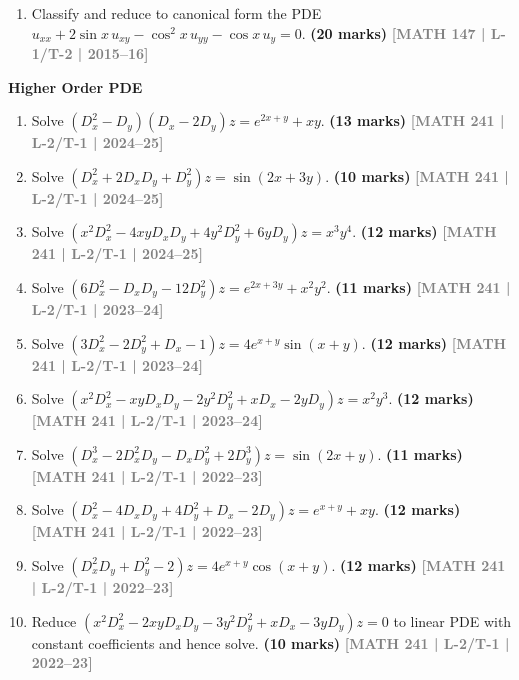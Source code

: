 \documentclass[12pt,a4paper]{article}
\newcommand{\yr}[1]{\hfill\textcolor{gray}{\small\textbf{[#1]}}}
\newcommand{\mk}[1]{\textcolor{orange!70!black}{\small\textbf{(#1 marks)}}}
\newcommand{\subtopic}[2]{%
  \vspace{10pt}
  \noindent\begin{tcolorbox}[colback=#1!8,colframe=#1,boxrule=0.6pt,arc=4pt,
    left=6pt,right=6pt,top=4pt,bottom=4pt]
    \small\bfseries\textcolor{#1}{#2}
  \end{tcolorbox}
  \vspace{2pt}
}
\begin{document}
\begin{enumerate}\item Classify and reduce to canonical form the PDE $u_{xx}+2\sin x\,u_{xy}-\cos^{2}x\,u_{yy}-\cos x\,u_{y}=0$.
\mk{20} \yr{MATH 147 | L-1/T-2 | 2015--16}

\end{enumerate}

\subtopic{cF}{Higher Order PDE}
\label{sub:s6-higher}

\begin{enumerate}\item Solve $(D_{x}^{2}-D_{y})(D_{x}-2D_{y})z=e^{2x+y}+xy$.
\mk{13} \yr{MATH 241 | L-2/T-1 | 2024--25}

\item Solve $(D_{x}^{2}+2D_{x}D_{y}+D_{y}^{2})z=\sin(2x+3y)$.
\mk{10} \yr{MATH 241 | L-2/T-1 | 2024--25}

\item Solve $(x^{2}D_{x}^{2}-4xyD_{x}D_{y}+4y^{2}D_{y}^{2}+6yD_{y})z=x^{3}y^{4}$.
\mk{12} \yr{MATH 241 | L-2/T-1 | 2024--25}

\item Solve $(6D_{x}^{2}-D_{x}D_{y}-12D_{y}^{2})z=e^{2x+3y}+x^{2}y^{2}$.
\mk{11} \yr{MATH 241 | L-2/T-1 | 2023--24}

\item Solve $(3D_{x}^{2}-2D_{y}^{2}+D_{x}-1)z=4e^{x+y}\sin(x+y)$.
\mk{12} \yr{MATH 241 | L-2/T-1 | 2023--24}

\item Solve $(x^{2}D_{x}^{2}-xyD_{x}D_{y}-2y^{2}D_{y}^{2}+xD_{x}-2yD_{y})z=x^{2}y^{3}$.
\mk{12} \yr{MATH 241 | L-2/T-1 | 2023--24}

\item Solve $(D_{x}^{3}-2D_{x}^{2}D_{y}-D_{x}D_{y}^{2}+2D_{y}^{3})z=\sin(2x+y)$.
\mk{11} \yr{MATH 241 | L-2/T-1 | 2022--23}

\item Solve $(D_{x}^{2}-4D_{x}D_{y}+4D_{y}^{2}+D_{x}-2D_{y})z=e^{x+y}+xy$.
\mk{12} \yr{MATH 241 | L-2/T-1 | 2022--23}

\item Solve $(D_{x}^{2}D_{y}+D_{y}^{2}-2)z=4e^{x+y}\cos(x+y)$.
\mk{12} \yr{MATH 241 | L-2/T-1 | 2022--23}

\item Reduce $(x^{2}D_{x}^{2}-2xyD_{x}D_{y}-3y^{2}D_{y}^{2}+xD_{x}-3yD_{y})z=0$ to linear PDE with constant coefficients and hence solve.
\mk{10} \yr{MATH 241 | L-2/T-1 | 2022--23}


\end{enumerate}
\end{document}
